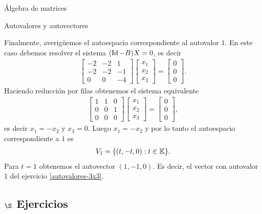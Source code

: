 \begin{chapter}{\'Algebra de matrices}
\begin{section}{Autovalores y autovectores}
\begin{ejemplo*}
        Finalmente,  averigüemos el  autoespacio correspondiente al  autovalor $1$. En este caso  debemos resolver el sistema $(\operatorname{Id}-B)X=0$, es decir
        \begin{align*}
        \begin{bmatrix}-2&-2&{ 1}\\-2&-2&-1\\0&0&-4\end{bmatrix}
        \begin{bmatrix}x_1\\x_2\\x_3\end{bmatrix}
        =
        \begin{bmatrix}0\\0\\0\end{bmatrix}.
        \end{align*}
        Haciendo reducción por filas obtenemos el sistema equivalente
        \begin{align*}
        \begin{bmatrix}1&1&0\\0&0&1\\0&0&0\end{bmatrix}
        \begin{bmatrix}x_1\\x_2\\x_3\end{bmatrix}
        =
        \begin{bmatrix}0\\0\\0\end{bmatrix},
        \end{align*}
        es decir $x_1=-x_2$ y $x_3=0$. Luego $x_1=-x_2$ y por lo tanto el autoespacio correspondiente a $1$ es
        \begin{align*}
        V_1=\{(t,-t,0): t\in\mathbb K\}.
        \end{align*}
        Para $t=1$ obtenemos el autovector $(1,-1,0)$. Es decir,  el vector con autovalor 1 del ejercicio  \ref{autovalores-3x3}.


        \end{ejemplo*}
    
        \subsection*{$\S$ Ejercicios}


\end{section}
\end{chapter}
